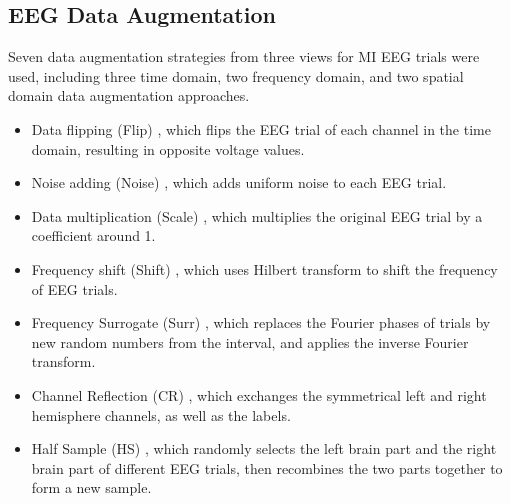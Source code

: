 \documentclass[journal]{IEEEtran}
\begin{document}
\subsection{EEG Data Augmentation}\label{sub:da_intro}
Seven data augmentation strategies from three views for MI EEG trials were used, including three time domain, two frequency domain, and two spatial domain data augmentation approaches. 
\begin{itemize}
\item Data flipping (Flip) \cite{Zhang2022MSDT}, which flips the EEG trial of each channel in the time domain, resulting in opposite voltage values.
\item Noise adding (Noise) \cite{Zhang2022MSDT}, which adds uniform noise to each EEG trial.
\item Data multiplication (Scale) \cite{Zhang2022MSDT}, which multiplies the original EEG trial by a coefficient around 1.
\item Frequency shift (Shift) \cite{Zhang2022MSDT}, which uses Hilbert transform to shift the frequency of EEG trials.
\item Frequency Surrogate (Surr) \cite{Schwabedal2018surr}, which replaces the Fourier phases of trials by new random numbers from the interval, and applies the inverse Fourier transform.
\item Channel Reflection (CR) \cite{Wang2024}, which exchanges the symmetrical left and right hemisphere channels, as well as the labels.
\item Half Sample (HS) \cite{pei2021hs}, which randomly selects the left brain part and the right brain part of different EEG trials, then recombines the two parts together to form a new sample.
\end{itemize}

\end{document}
